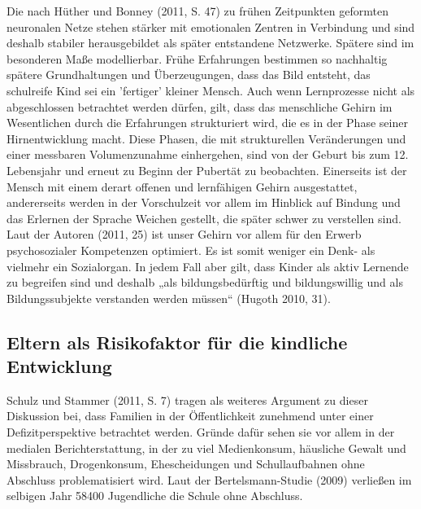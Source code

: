Die nach Hüther und Bonney (2011, S. 47) zu frühen Zeitpunkten geformten neuronalen Netze stehen stärker mit emotionalen Zentren in Verbindung und sind deshalb stabiler herausgebildet als später entstandene Netzwerke. Spätere sind im besonderen Maße modellierbar.
Frühe Erfahrungen bestimmen so nachhaltig spätere Grundhaltungen und Überzeugungen, dass das Bild entsteht, das schulreife Kind sei ein ’fertiger' kleiner Mensch. Auch wenn Lernprozesse nicht als abgeschlossen betrachtet werden dürfen, gilt, dass das menschliche Gehirn im Wesentlichen durch die Erfahrungen strukturiert wird, die es in der Phase seiner Hirnentwicklung macht. 
Diese Phasen, die mit strukturellen Veränderungen und einer messbaren Volumenzunahme einhergehen, sind von der Geburt bis zum 12. Lebensjahr und erneut zu Beginn der Pubertät zu beobachten. 
Einerseits ist der Mensch mit einem derart offenen und lernfähigen Gehirn ausgestattet, andererseits werden in der Vorschulzeit vor allem im Hinblick auf Bindung und das Erlernen der Sprache Weichen gestellt, die später schwer zu verstellen sind. Laut der Autoren  (2011, 25) ist unser Gehirn vor allem für den Erwerb psychosozialer Kompetenzen optimiert. Es ist somit weniger ein Denk- als vielmehr ein Sozialorgan.  
In jedem Fall aber gilt, dass Kinder als aktiv Lernende zu begreifen sind und deshalb „als bildungsbedürftig und bildungswillig und als Bildungssubjekte verstanden werden müssen“ (Hugoth 2010, 31).
 
\subsection{Eltern als Risikofaktor für die kindliche Entwicklung}\label{sec:Risikofaktoren}
Schulz und Stammer (2011, S. 7) tragen als weiteres Argument zu dieser Diskussion bei, dass Familien in der Öffentlichkeit zunehmend unter einer Defizitperspektive betrachtet werden. Gründe dafür sehen sie vor allem in der medialen Berichterstattung, in der zu viel Medienkonsum, häusliche Gewalt und Missbrauch, Drogenkonsum, Ehescheidungen und  Schullaufbahnen ohne Abschluss problematisiert wird. Laut der Bertelsmann-Studie (2009) verließen im selbigen Jahr 58400 Jugendliche die Schule ohne Abschluss. 


